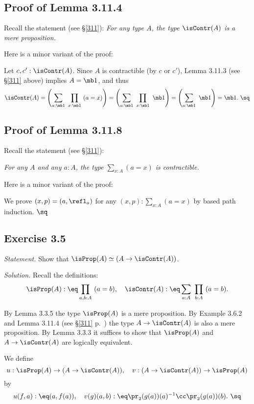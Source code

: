 \documentclass[12pt]{article}
\begin{document}

\subsection{Proof of Lemma 3.11.4} 

Recall the statement (see \S\ref{311}): \emph{For any type $A$, the type $\isContr(A)$ is a mere proposition.}

Here is a minor variant of the proof:

Let $c,c':\isContr(A)$. Since $A$ is contractible (by $c$ or $c'$), Lemma 3.11.3 (see \S\ref{311} above) implies $A=\mb1$, and thus 
$$
\isContr(A)=\left(\sum_{a:\mb1}\ \prod_{x:\mb1}\ (a=x)\right)=\left(\sum_{a:\mb1}\ \prod_{x:\mb1}\ \mb1\right)=\left(\sum_{a:\mb1}\ \mb1\right)=\mb1.\ \sq
$$


\subsection{Proof of Lemma 3.11.8} 

Recall the statement (see \S\ref{311}): 

\nn\emph{For any $A$ and any $a:A$, the type $\sum_{x:A}(a=x)$ is contractible.}

Here is a minor variant of the proof:

We prove $(x,p)=(a,\refl_a)$ for any $(x,p):\sum_{x:A}(a=x)$ by based path induction. $\sq$


\subsection{Exercise 3.5}

\emph{Statement.} Show that $\isProp(A)\simeq(A\to\isContr(A))$. 

\nn\emph{Solution.} Recall the definitions: 
$$
\isProp(A):\eq\prod_{a,b:A}\ (a=b),\quad\isContr(A):\eq\sum_{a:A}\ \prod_{b:A}\ (a=b).
$$

By Lemma 3.3.5 the type $\isProp(A)$ is a mere proposition. By Example 3.6.2 and Lemma 3.11.4 (see \S\ref{311} p.~\pageref{311}) the type $A\to\isContr(A)$ is also a mere proposition. By Lemma 3.3.3 it suffices to show that $\isProp(A)$ and $A\to\isContr(A)$ are logically equivalent. 

We define 
$$
u:\isProp(A)\to(A\to\isContr(A)),\quad v:(A\to\isContr(A))\to\isProp(A)
$$ 
by 
$$
u(f,a):\eq(a,f(a)),\quad v(g)(a,b):\eq\pr_2(g(a))(a)^{-1}\cc\pr_2(g(a))(b).\ \sq
$$
\end{document}
